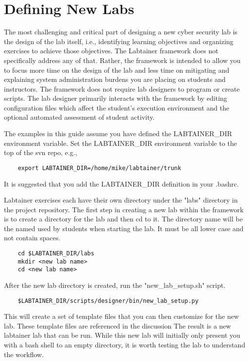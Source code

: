 \documentclass[12pt]{article}
\begin{document}
\section {Defining New Labs}
\label{sec:new_labs}
The most challenging and critical part of designing a new cyber security lab
is the design of the lab itself, i.e., identifying learning objectives and
organizing exercises to achieve those objectives.  The Labtainer framework
does not specifically address any of that.  Rather, the framework is intended
to allow you to focus more time on the design of the lab and less time on mitigating and
explaining system administration burdens you are placing on students and instructors.
The framework does not require lab designers to program or create scripts.  The
lab designer primarily interacts with the framework by editing configuration files
which affect the student's execution environment and the optional automated
assessment of student activity.

The examples in this guide assume you have defined the LABTAINER\_DIR environment variable.
Set the LABTAINER\_DIR environment variable to the top of the svn repo, e.g.,
\begin{verbatim}
    export LABTAINER_DIR=/home/mike/labtainer/trunk
\end{verbatim}
It is suggested that you add the LABTAINER\_DIR definition in your .bashrc.

Labtainer exercises each have their own
directory under the "labs" directory in the project repository.
The first step in creating a new lab within the framework is to create
a directory for the lab and then cd to it.  The directory name will be the named
used by students when starting the lab.  It must be all lower case and not contain spaces.
\begin{verbatim}
    cd $LABTAINER_DIR/labs
    mkdir <new lab name>
    cd <new lab name>
\end{verbatim}

After the new lab directory is created, run the "new\_lab\_setup.sh" script.
\begin{verbatim}
    $LABTAINER_DIR/scripts/designer/bin/new_lab_setup.py
\end{verbatim}
This will create a set of template files that you can then customize
for the new lab.  These template files are referenced in the discussion
The result is a new labtainer lab that can be run.  While this new
lab will initially only present you with a bash shell to an
empty directory, it is worth testing the lab to understand the workflow.
\end{document}
